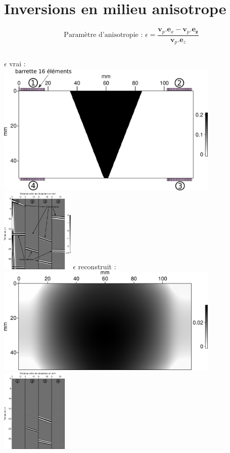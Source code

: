 \documentclass[10pt,xcolor=x11names,compress, notes=show]{beamer}%
\begin{document}
\section{Inversions en milieu anisotrope}
\begin{frame}{\insertsectionhead}
\begin{small}

	\vspace{-1cm}
	\begin{equation*}
		\text{Paramètre d'anisotropie : }\epsilon = \frac{\bm{v}_{p}.\bm{e}_{x}-\bm{v}_{p}.\bm{e_{z}}}{\bm{v}_{p}.\bm{e}_{z}}
	\end{equation*}
	\begin{columns}
		\centering
		$\epsilon$ vrai : \\[0.2cm]
		\includegraphics[width=0.8\textwidth]{img/anisotrope/epsilon_true.png}\\
		\includegraphics[height=4cm]{img/anisotrope/e20.png}
		\centering
		$\epsilon$ reconstruit : \\[0.2cm]
		\includegraphics[width=0.8\textwidth]{img/anisotrope/epsilon_final.png}\\
		\includegraphics[height=4cm]{img/anisotrope/residu_init.png}
		

\end{columns}
\end{small}
\end{frame}
\end{document}
